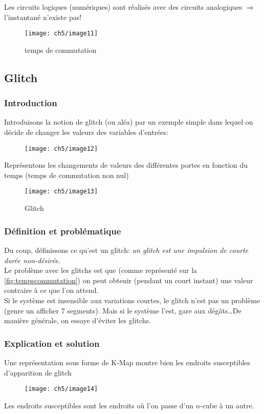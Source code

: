 Les circuits logiques (numériques) sont réalisés avec des circuits analogiques $\Rightarrow$ l'instantané n'existe pas!
\begin{figure}[H]
	\centering
	\texttt{[image: ch5/image11]}
	\caption{temps de commutation}
	\label{fig:tempscommutation}
\end{figure}

\subsection{Glitch}
\subsubsection{Introduction}
Introduisons la notion de glitch (ou aléa) par  un exemple simple dans lequel on décide de changer les valeurs des variables d'entrées:
\begin{figure}[H]
	\centering
	\texttt{[image: ch5/image12]}
\end{figure}
Représentons les changements de valeurs des différentes portes en fonction du temps (temps de commutation non nul)
\begin{figure}[H]
	\centering
	\texttt{[image: ch5/image13]}
	\caption{Glitch}
\end{figure}
\subsubsection{Définition et problématique}
Du coup, définissons ce qu'est un glitch: \textit{un glitch est une impulsion de courte durée non-désirée}.\\

Le problème avec les glitchs est que (comme représenté sur la \autoref{fig:tempscommutation}) on peut obtenir (pendant un court instant) une valeur contraire à ce que l'on attend.\\
Si le système est insensible aux variations courtes, le glitch n'est pas un problème (genre un afficher 7 segments). Mais si le système l'est, gare aux dégâts\dots De manière générale, on essaye d'éviter les glitchs.\\
\subsubsection{Explication et solution}
Une représentation sous forme de K-Map montre bien les endroits susceptibles d'apparition de glitch
\begin{figure}[H]
	\centering
	\texttt{[image: ch5/image14]}
\end{figure}
Les endroits susceptibles sont les endroits où l'on passe d'un $n$-cube à un autre.\\

